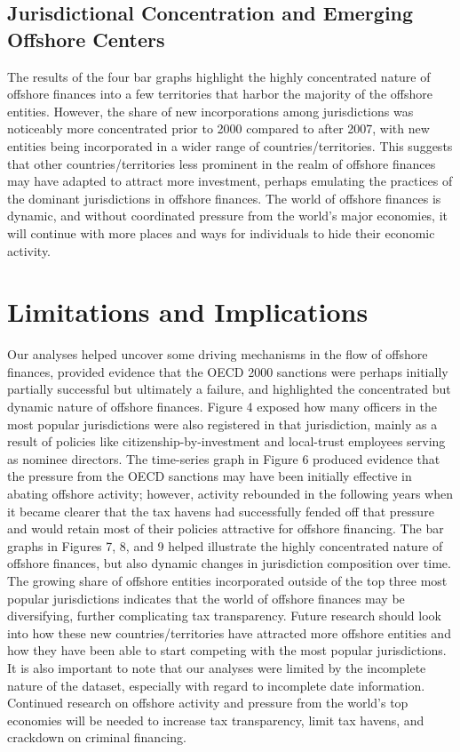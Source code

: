 \documentclass{article}
\begin{document}
\subsection{Jurisdictional Concentration and Emerging Offshore Centers}
The results of the four bar graphs highlight the highly concentrated nature of offshore finances into a few territories that harbor the majority of the offshore entities. However, the share of new incorporations among jurisdictions was noticeably more concentrated prior to 2000 compared to after 2007, with new entities being incorporated in a wider range of countries/territories. This suggests that other countries/territories less prominent in the realm of offshore finances may have adapted to attract more investment, perhaps emulating the practices of the dominant jurisdictions in offshore finances. The world of offshore finances is dynamic, and without coordinated pressure from the world’s major economies, it will continue with more places and ways for individuals to hide their economic activity.


\section{Limitations and Implications }
Our analyses helped uncover some driving mechanisms in the flow of offshore finances, provided evidence that the OECD 2000 sanctions were perhaps initially partially successful but ultimately a failure, and highlighted the concentrated but dynamic nature of offshore finances. Figure 4 exposed how many officers in the most popular jurisdictions were also registered in that jurisdiction, mainly as a result of policies like citizenship-by-investment and local-trust employees serving as nominee directors. The time-series graph in Figure 6 produced evidence that the pressure from the OECD sanctions may have been initially effective in abating offshore activity; however, activity rebounded in the following years when it became clearer that the tax havens had successfully fended off that pressure and would retain most of their policies attractive for offshore financing. The bar graphs in Figures 7, 8, and 9 helped illustrate the highly concentrated nature of offshore finances, but also dynamic changes in jurisdiction composition over time. The growing share of offshore entities incorporated outside of the top three most popular jurisdictions indicates that the world of offshore finances may be diversifying, further complicating tax transparency. Future research should look into how these new countries/territories have attracted more offshore entities and how they have been able to start competing with the most popular jurisdictions. It is also important to note that our analyses were limited by the incomplete nature of the dataset, especially with regard to incomplete date information. Continued research on offshore activity and pressure from the world’s top economies will be needed to increase tax transparency, limit tax havens, and crackdown on criminal financing.

\newpage
\nocite{*}


\end{document}
